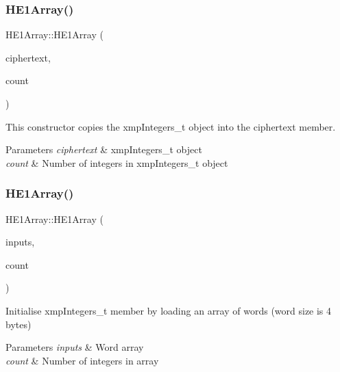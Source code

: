 \subsubsection{\texorpdfstring{H\+E1\+Array()}{HE1Array()}\hspace{0.1cm}{\footnotesize\ttfamily [4/6]}}
{\footnotesize\ttfamily H\+E1\+Array\+::\+H\+E1\+Array (\begin{DoxyParamCaption}\item[{xmp\+Integers\+\_\+t}]{ciphertext,  }\item[{unsigned int}]{count }\end{DoxyParamCaption})}

This constructor copies the {\ttfamily xmp\+Integers\+\_\+t} object into the {\ttfamily ciphertext} member. 
\begin{DoxyParams}{Parameters}
{\em ciphertext} & {\ttfamily xmp\+Integers\+\_\+t} object \\
\hline
{\em count} & Number of integers in {\ttfamily xmp\+Integers\+\_\+t} object \\
\hline
\end{DoxyParams}
\mbox{\label{classHE1Array_ab07215fb33d5e7c2422ef7201752759b}} 
\subsubsection{\texorpdfstring{H\+E1\+Array()}{HE1Array()}\hspace{0.1cm}{\footnotesize\ttfamily [5/6]}}
{\footnotesize\ttfamily H\+E1\+Array\+::\+H\+E1\+Array (\begin{DoxyParamCaption}\item[{\hyperlink{HE1Array_8h_a19036394f9c80a08fc846c96f668711c}{word} $\ast$}]{inputs,  }\item[{unsigned int}]{count }\end{DoxyParamCaption})}

Initialise {\ttfamily xmp\+Integers\+\_\+t} member by loading an array of words (word size is 4 bytes) 
\begin{DoxyParams}{Parameters}
{\em inputs} & Word array \\
\hline
{\em count} & Number of integers in array \\
\hline
\end{DoxyParams}
\mbox{\label{classHE1Array_a83a31561044fe24c711526bb2e137de7}} 
